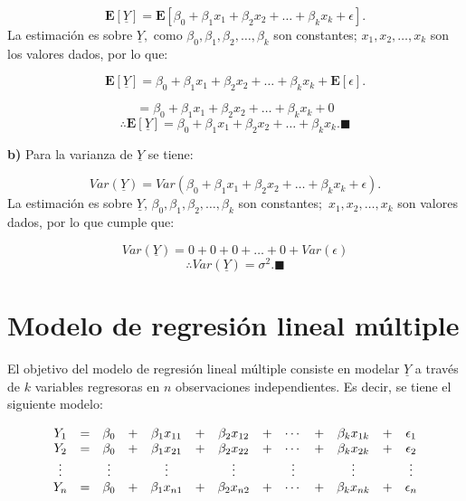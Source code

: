 \documentclass[a4paper,oneside,openany]{book}
\begin{document}
\[\mathbf{E}[\underline{Y}]=\mathbf{E}[\beta_{0}+\beta_{1}x_{1}+\beta_{2}x_{2}+ \ldots +\beta_{k}x_{k}+\epsilon].\]
La estimación es sobre \(\underline{Y},\) como
\(\beta_{0},\beta_{1},\beta_{2},\ldots,\beta_{k}\) son constantes;
\(x_{1},x_{2}, \ldots,x_{k}\) son los valores dados, por lo que:

\[\mathbf{E}[\underline{Y}]=\beta_{0}+\beta_{1}x_{1}+\beta_{2}x_{2}+ \ldots +\beta_{k}x_{k}+\mathbf{E}[\epsilon].\]

\[=\beta_{0}+\beta_{1}x_{1}+\beta_{2}x_{2}+ \ldots +\beta_{k}x_{k}+0\]
\[\therefore \mathbf{E}[\underline{Y}]= \beta_{0}+\beta_{1}x_{1}+\beta_{2}x_{2}+ \ldots + \beta_{k}x_{k}. \blacksquare\]

\textbf{b)} Para la varianza de \(\underline{Y}\) se tiene:

\[Var(\underline{Y})=Var\left( \beta_{0}+\beta_{1}x_{1}+\beta_{2}x_{2}+ \ldots + \beta_{k}x_{k}+ \epsilon\right).\]
La estimación es sobre \(\underline{Y}\),
\(\beta_{0},\beta_{1},\beta_{2},\ldots,\beta_{k}\) son
constantes;~\(x_{1},x_{2},\ldots,x_{k}\) son valores dados, por lo que
cumple que:

\[Var(\underline{Y})=0+0+0+\ldots+0+Var(\epsilon)\]
\[\therefore Var(\underline{Y})=\sigma^2.\blacksquare\]

\section{Modelo de regresión lineal
múltiple}\label{modelo-de-regresiuxf3n-lineal-muxfaltiple-1}

El objetivo del modelo de regresión lineal múltiple consiste en modelar
\(\underline{Y}\) a través de \(k\) variables regresoras en \(n\)
observaciones independientes. Es decir, se tiene el siguiente modelo:

\[
\begin{equation*}
\begin{array}{ c c c c c c c c c c c c c }
Y_{1}  & = & \beta_{0} & + & \beta_{1}x_{11}& +& \beta_{2}x_{12} & +& \cdots & + & \beta_{k}x_{1k} & + & \epsilon_{1}  \\ 
Y_{2}  & = & \beta_{0} & + & \beta_{1}x_{21}& +& \beta_{2}x_{22} & +& \cdots & + & \beta_{k}x_{2k} & + & \epsilon_{2}  \\
\vdots  &  & \vdots &  & \vdots& & \vdots & & \vdots & & \vdots &  & \vdots  \\
Y_{n}  & = & \beta_{0} & + & \beta_{1}x_{n1}& +& \beta_{2}x_{n2} & +& \cdots & + & \beta_{k}x_{nk} & + & \epsilon_{n}  \\ 
\end{array}
\end{equation*}
\]
\end{document}
